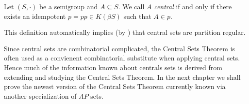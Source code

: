 \begin{defn}
  Let $(S, \cdot)$ be a semigroup and $A \subseteq S$.
  We call $A$ \emph{central} if and only if there exists an idempotent $p = pp \in K(\beta S)$ such that $A \in p$.
\end{defn}
\begin{rmk}
  This definition automatically implies (by \cite[Theorem 3.6(d)]{Hindman:1998fk}) that central sets are partition regular.   
\end{rmk}

Since central sets are combinatorial complicated, the Central Sets Theorem is often used as a convienent combinatorial substitute when applying central sets.
Hence much of the information known about centrals sets is derived from extending and studying the Central Sets Theorem.
In the next chapter we shall prove the newest version of the Central Sets Theorem currently known via another specialization of $AP$-sets.

\theendnotes

